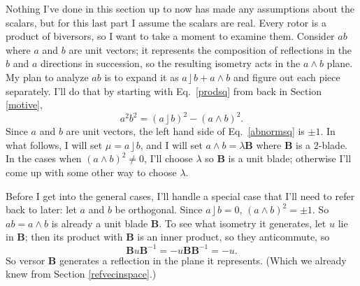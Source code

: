 \documentclass{utarticle}
\newcommand{\bl}[1]{\ensuremath{\bm{#1}}}
\DeclareMathOperator{\lin}{\rfloor}
\DeclareMathOperator{\out}{\wedge}
\begin{document}
Nothing I've done in this section up to now has made any assumptions about the scalars, but for this last part
I assume the scalars are real.  Every rotor is a product of biversors, so I want to take a moment to 
examine them. Consider $ab$ where $a$ and $b$ are unit vectors; it represents the composition of reflections in 
the $b$ and $a$ directions in succession, so the resulting isometry acts in the $a \out b$ plane.  
My plan to analyze $ab$ is to expand it as $a \lin b + a \out b$ and figure out each piece separately.  I'll do that
by starting with Eq.~\eqref{prodsq} from back in Section \ref{motive},
\begin{equation} a^2b^2 = (a \lin b)^2 - (a \out b)^2. \label{abnormsq} \end{equation}
Since $a$ and $b$ are unit vectors, the left hand side of Eq.~\eqref{abnormsq} is $\pm1$.  In what follows, I will
set $\mu = a \lin b$, and I will set $a \out b = \lambda \bl{B}$ where \bl{B} is a $2$-blade.  In the cases
when $(a \out b)^2 \neq 0$, I'll choose $\lambda$ so \bl{B} is a unit blade; otherwise I'll come up with
some other way to choose $\lambda$.

Before I get into the general cases, I'll handle a special case that I'll need to refer back to later: let $a$ 
and $b$ be orthogonal.  Since $a \lin b = 0$, $(a \out b)^2 = \pm1$.  So $ab = a \out b$ is already a unit 
blade \bl{B}.  To see what isometry it generates, let $u$ lie in \bl{B}; then its product with \bl{B} is an 
inner product, so they anticommute, so
\begin{equation} \bl{B} u \bl{B}^{-1} = -u\bl{B}\bl{B}^{-1} = -u. \end{equation}
So versor \bl{B} generates a reflection in the plane it represents.  (Which we already knew from Section 
\ref{refvecinspace}.)
\end{document}

